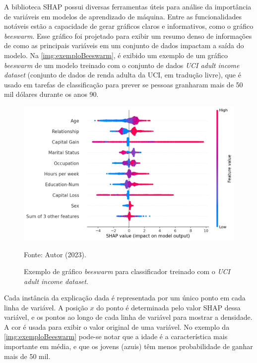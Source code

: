 A biblioteca SHAP possui diversas ferramentas úteis para análise da importância de variáveis em modelos de aprendizado de máquina. Entre as funcionalidades notáveis estão a capacidade de gerar gráficos claros e informativos, como o gráfico \textit{beeswarm}. Esse gráfico foi projetado para exibir um resumo denso de informações de como as principais variáveis em um conjunto de dados impactam a saída do modelo. Na \autoref{img:exemploBeeswarm}, é exibido um exemplo de um gráfico \textit{beeswarm} de um modelo treinado com o conjunto de dados \textit{UCI adult income dataset} (conjunto de dados de renda adulta da UCI, em tradução livre), que é usado em tarefas de classificação para prever se pessoas granharam mais de 50 mil dólares durante os anos 90.

\begin{figure}
	\centering
	\caption{\label{img:exemploBeeswarm}Exemplo de gráfico \textit{beeswarm} para classificador treinado com o \textit{UCI adult income dataset}.}
	\includegraphics[scale=0.7]{USPSC-img/exemplo_beeswarm.png}
	\begin{center}
		Fonte: Autor (2023).
	\end{center}
\end{figure}

Cada instância da explicação dada é representada por um único ponto em cada linha de variável. A posição $x$ do ponto é determinada pelo valor SHAP dessa variável, e os pontos  ao longo de cada linha de variável para mostrar a densidade. A cor é usada para exibir o valor original de uma variável. No exemplo da \autoref{img:exemploBeeswarm} pode-se notar que a idade é a característica mais importante em média, e que os jovens (azuis) têm menos probabilidade de ganhar mais de 50 mil.

